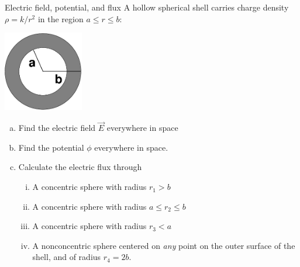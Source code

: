 \documentclass{esg8022pset}
\begin{document}
\begin{problem}{Electric field, potential, and flux}
  A hollow spherical shell carries charge density $\rho = k/r^2$ in the
  region $a \le r \le b$:
  \begin{center}\includegraphics[width=3.5cm]{ps03_09}\end{center}
  \begin{enumerate}[(a)]
    \item Find the electric field $\vec E$ everywhere in space
    \item Find the potential $\phi$ everywhere in space.
    \item Calculate the electric flux through
      \begin{enumerate}[(i)]
        \item A concentric sphere with radius $r_1 > b$
        \item A concentric sphere with radius $a \le r_2 \le b$
        \item A concentric sphere with radius $r_3 < a$
        \item A nonconcentric sphere centered on \emph{any} point on the
          outer surface of the shell, and of radius $r_4 = 2b$.
      \end{enumerate}
  \end{enumerate}
\end{problem}
\end{document}
